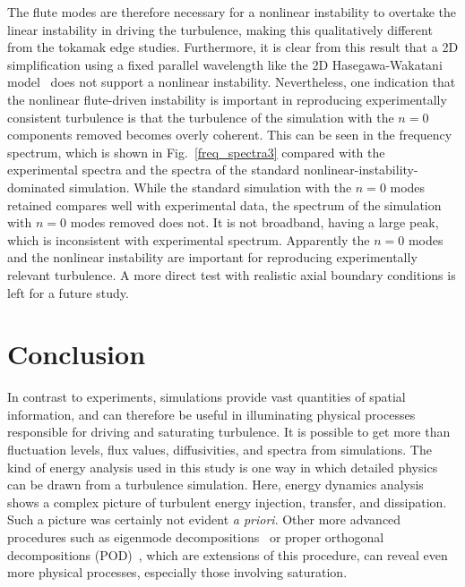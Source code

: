 \documentclass[showpacs,preprintnumbers,amsmath,amssymb,superscriptaddress,aip]{revtex4-1}
\begin{document}
The flute modes are therefore necessary for a nonlinear instability to overtake the linear instability in driving the turbulence, making this qualitatively different from the
tokamak edge studies. Furthermore, it is clear from this result that a 2D simplification
using a fixed parallel wavelength like the 2D Hasegawa-Wakatani model~\cite{hasegawa1983} does not support a nonlinear instability.
Nevertheless, one indication that the nonlinear flute-driven instability is important in reproducing experimentally consistent turbulence 
is that the turbulence of the simulation with the $n=0$ components removed becomes overly coherent. This can be seen in the
frequency spectrum, which is shown in
Fig.~\ref{freq_spectra3} compared with the experimental spectra and
the spectra of the standard nonlinear-instability-dominated
simulation. While the standard simulation with the $n=0$ modes retained compares
well with experimental data, the spectrum of the simulation with $n=0$ modes removed does not. It is not broadband, having a large peak, which is
inconsistent with experimental spectrum.  Apparently the $n=0$ modes and the nonlinear instability are important for reproducing experimentally relevant turbulence. 
A more direct test with realistic axial boundary conditions is left for a future study.


\section{Conclusion}

In contrast to experiments, simulations provide vast quantities of spatial information, and can therefore be useful in illuminating physical processes responsible for driving and saturating
turbulence. It is possible to get more than fluctuation levels, flux values, diffusivities, and spectra from simulations. The kind of energy analysis used in this study is one 
way in which detailed physics can be drawn from a turbulence simulation. Here, energy dynamics analysis shows a complex picture of turbulent energy injection, transfer, and dissipation. 
Such a picture was certainly not evident \emph{a priori}.
Other more advanced procedures such as eigenmode decompositions~\cite{baver2002} or proper orthogonal decompositions (POD)~\cite{hatch2011}, which are extensions of this procedure,
can reveal even more physical processes, especially those involving saturation. 
\end{document}
